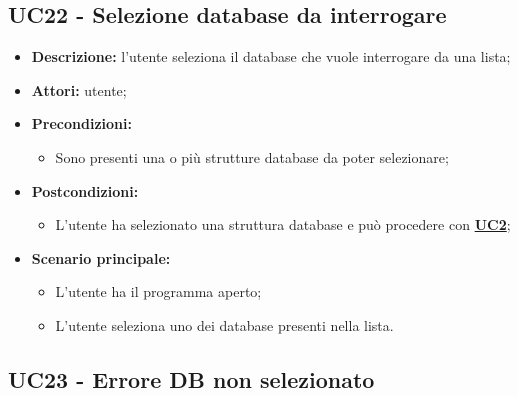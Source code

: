 \subsection{UC22 - Selezione database da interrogare}
\label{sec:UC22}
\begin{itemize}
	\item \textbf{Descrizione:} l’utente seleziona il database che vuole interrogare da una lista;
	\item \textbf{Attori:} utente;
	\item \textbf{Precondizioni:}
	\begin{itemize}
		\item Sono presenti una o più strutture database da poter selezionare;
	\end{itemize}
	\item \textbf{Postcondizioni:}
	\begin{itemize}
		\item L’utente ha selezionato una struttura database e può procedere con \hyperref[sec:UC2]{\textbf{UC2}};
	\end{itemize}
	\item \textbf{Scenario principale:}
	\begin{itemize}
		\item L’utente ha il programma aperto;
		\item L’utente seleziona uno dei database presenti nella lista.
	\end{itemize}
\end{itemize}

\subsection{UC23 - Errore DB non selezionato}
\label{sec:UC23}

